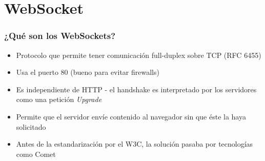 

%






\section{WebSocket}


\begin{frame}
\frametitle{¿Qué son los WebSockets?}

\begin{itemize}
  \item Protocolo que permite tener comunicación full-duplex sobre TCP (RFC 6455)
  \item Usa el puerto 80 (bueno para evitar firewalls)
  \item Es independiente de HTTP - el handshake es interpretado por los servidores como una petición \emph{Upgrade}
  \item Permite que el servidor envíe contenido al navegador sin que éste la haya solicitado
  \item Antes de la estandarización por el W3C, la solución pasaba por tecnologías como Comet
\end{itemize}

\end{frame}



